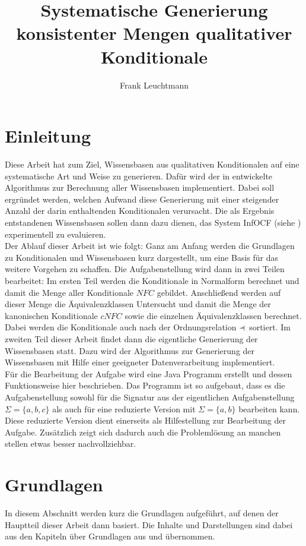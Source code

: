 \documentclass[12pt,a4paper]{article}
\author{Frank Leuchtmann}
\title{Systematische Generierung konsistenter Mengen qualitativer
Konditionale}
\newcommand\rdotl{\mathrel{%
    \mathchoice{\RQEQ}{\RQEQ}{\RQEQ}{\RQEQ}%
}}
\def\RQEQ{{%
    \setbox0\hbox{$\prec$}%
    \rlap{\hbox to \wd0{\hss \raisebox {0.01pt}{$\ \cdot$\hss}}}\box0
}}
\begin{document}
\maketitle
\newpage
\tableofcontents
\newpage
\section{Einleitung}
Diese Arbeit hat zum Ziel, Wissensbasen aus qualitativen Konditionalen auf eine systematische Art und Weise zu generieren. Dafür wird der in \cite{beierle19} entwickelte Algorithmus zur Berechnung aller Wissensbasen implementiert. Dabei soll ergründet werden, welchen Aufwand diese Generierung mit einer steigender Anzahl der darin  enthaltenden Konditionalen verursacht. Die als Ergebnis entstandenen Wissensbasen sollen dann dazu dienen, das System InfOCF (siehe \cite{beierle17}) experimentell zu evaluieren. \\
Der Ablauf dieser Arbeit ist wie folgt: Ganz am Anfang werden die Grundlagen zu Konditionalen und Wissensbasen kurz dargestellt, um eine Basis für das weitere Vorgehen zu schaffen. Die Aufgabenstellung wird dann in zwei Teilen bearbeitet: Im ersten Teil werden die Konditionale in Normalform berechnet und damit die Menge aller Konditionale $NFC$ gebildet. Anschließend werden auf dieser Menge die Äquivalenzklassen Untersucht und damit die Menge der kanonischen Konditionale $cNFC$ sowie die einzelnen Äquivalenzklassen berechnet. Dabei werden die Konditionale auch nach der Ordnungsrelation $\rdotl$ sortiert. Im zweiten Teil dieser Arbeit findet dann die eigentliche Generierung der Wissensbasen statt. Dazu wird der Algorithmus zur Generierung der Wissensbasen mit Hilfe einer geeigneter Datenverarbeitung implementiert.\\
Für die Bearbeitung der Aufgabe wird eine Java Programm erstellt und dessen Funktionsweise hier beschrieben. Das Programm ist so aufgebaut, dass es die Aufgabenstellung sowohl für die Signatur aus der eigentlichen Aufgabenstellung $\Sigma = \{a,b,c\}$ als auch für eine reduzierte Version mit $\Sigma = \{a,b\}$ bearbeiten kann. Diese reduzierte Version dient einerseits als Hilfestellung zur Bearbeitung der Aufgabe. Zusätzlich zeigt sich dadurch auch die Problemlösung an manchen stellen etwas besser nachvollziehbar.
\section{Grundlagen}
In diesem Abschnitt werden kurz die Grundlagen aufgeführt, auf denen der Hauptteil dieser Arbeit dann basiert. Die Inhalte und Darstellungen sind dabei aus den Kapiteln über Grundlagen aus \cite{beierle19} und \cite{beierle17} übernommen.
\end{document}

